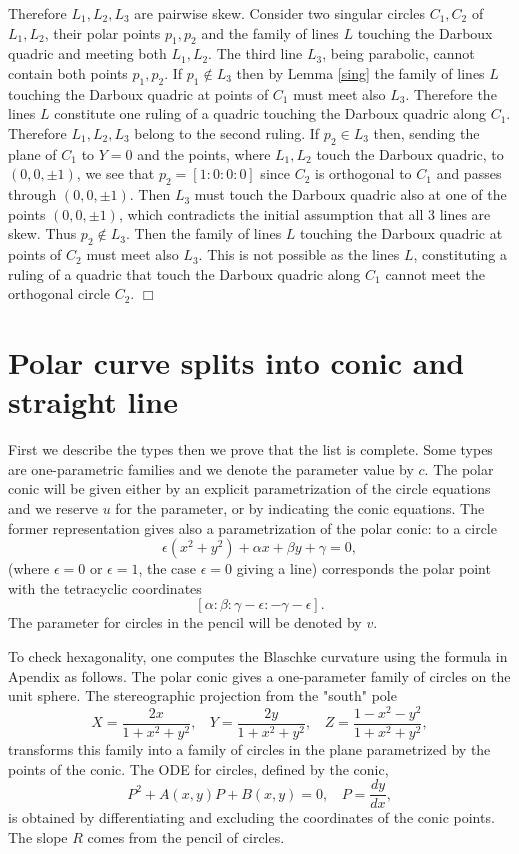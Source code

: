 \documentclass[11pt,a4paper]{article}
\begin{document}
Therefore $L_1,L_2,L_3$ are pairwise skew.   Consider two singular circles $C_1,C_2$ of $L_1,L_2$, their polar points $p_1,p_2$ and the family of lines $L$ touching the Darboux quadric and meeting both $L_1,L_2$. The third line $L_3$, being parabolic, cannot contain both  points $p_1,p_2$. If $p_1 \notin L_3$ then by Lemma \ref{sing} the family of lines $L$ touching the Darboux quadric at points of $C_1$ must meet also $L_3$. Therefore the lines  $L$ constitute one ruling of a quadric touching the Darboux quadric along $C_1$. Therefore $L_1,L_2,L_3$ belong to the second ruling. If $p_2\in L_3$ then, sending the plane of $C_1$ to $Y=0$ and the points, where $L_1,L_2$ touch the Darboux quadric, to $(0,0,\pm 1)$, we see that $p_2=[1:0:0:0]$ since $C_2$ is orthogonal  to $C_1$ and passes through  $(0,0,\pm 1)$. Then $L_3$ must touch the Darboux quadric also at one of the points $(0,0,\pm 1)$, which contradicts the initial assumption that all 3 lines are skew.  Thus  $p_2\notin L_3$. Then the family of lines $L$ touching the Darboux quadric at points of $C_2$ must meet also $L_3$. This is not possible as the lines $L$, constituting a ruling of a quadric that touch the Darboux quadric along $C_1$ cannot meet the orthogonal circle $C_2$.      
 \hfill $\Box$\\

\section{Polar curve splits into  conic and  straight line}\label{split}

First we describe the types then we prove that the list is complete. 
Some types are one-parametric families and we denote the parameter value  by $c$. The polar conic will be given either by an explicit parametrization of the circle equations and we reserve $u$ for the parameter, or by indicating the conic  equations. The former representation gives also a parametrization of the polar conic:  to a circle   
$$
\epsilon (x^2+y^2)+\alpha x+\beta y+\gamma=0,
$$
(where $\epsilon=0$ or $\epsilon=1$, the case  $\epsilon=0$ giving a line)
corresponds the polar point with the tetracyclic coordinates
\begin{equation}\label{polarofcircle}
[\alpha:\beta:\gamma-\epsilon:-\gamma-\epsilon].
\end{equation}
The parameter for circles in the pencil will be denoted by $v$.

To check hexagonality, one computes the Blaschke curvature using the formula in Apendix as follows. The polar conic gives a one-parameter family of circles on the unit sphere.  
The stereographic projection from the "south"  pole 
$$
X=\frac{2x}{1+x^2+y^2}, \ \ \ \ Y=\frac{2y}{1+x^2+y^2}, \ \ \ \ Z=\frac{1-x^2-y^2}{1+x^2+y^2},
$$
 transforms this family into  a family of circles in the plane parametrized by the points  of the conic. The ODE for circles, defined by the conic,
\begin{equation}
P^2+A(x,y)P+B(x,y)=0, \ \ \ \ P=\frac{dy}{dx},
\end{equation} 
  is obtained by differentiating and excluding the coordinates of the conic points. 
 The slope $R$ comes from the pencil of circles. 
 
\end{document}
